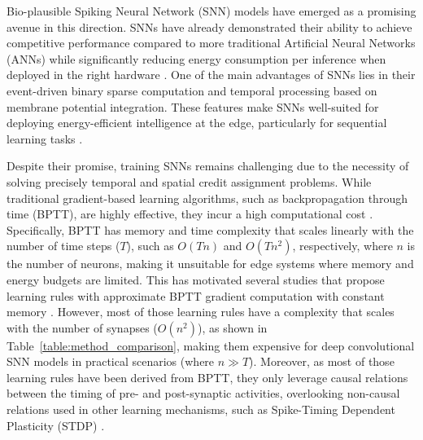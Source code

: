 \documentclass[10pt]{article} %
\begin{document}
    Bio-plausible Spiking Neural Network (SNN) models have emerged as a promising avenue in this direction. 
    SNNs have already demonstrated their ability to achieve competitive performance compared to more traditional Artificial Neural Networks (ANNs) while significantly reducing energy consumption per inference when deployed in the right hardware \citep{Davies2018Loihi:Learning, Roy2019, Sengupta2019, Neftci2019SurrogateNetworks, Christensen20222022Engineering}.
    One of the main advantages of SNNs lies in their event-driven binary sparse computation and temporal processing based on membrane potential integration. 
    These features make SNNs well-suited for deploying energy-efficient intelligence at the edge, particularly for sequential learning tasks \citep{Ponghiran2022SpikingLearning, Bellec2020ANeurons, Christensen20222022Engineering}.
    
    Despite their promise, training SNNs remains challenging due to the necessity of solving precisely temporal and spatial credit assignment problems. 
    While traditional gradient-based learning algorithms, such as backpropagation through time (BPTT), are highly effective, they incur a high computational cost \citep{Eshraghian2023TrainingLearning, Bellec2020ANeurons, Bohnstingl2022OnlineNetworks}. 
    Specifically, BPTT has memory and time complexity that scales linearly with the number of time steps ($T$), such as $O(Tn)$ and $O(Tn^2)$, respectively, where $n$ is the number of neurons,
    making it unsuitable for edge systems where memory and energy budgets are limited.
    This has motivated several studies that propose learning rules with approximate BPTT gradient computation with constant memory \citep{Bellec2020ANeurons, Bohnstingl2022OnlineNetworks, Quintana2023ETLP:Hardware, Ortner2023OnlineProjection, Xiao2022OnlineNetworks}.
    However, most of those learning rules have a complexity that scales with the number of synapses ($O(n^2)$), as shown in Table~\ref{table:method_comparison}, making them expensive for deep convolutional SNN models in practical scenarios (where $n\gg T$).
    Moreover, as most of those learning rules have been derived from BPTT, they only leverage causal relations between the timing of pre- and post-synaptic activities, overlooking non-causal relations used in other learning mechanisms, such as Spike-Timing Dependent Plasticity (STDP) \citep{Bi1998SynapticType, Song2000CompetitivePlasticity}.
\end{document}
